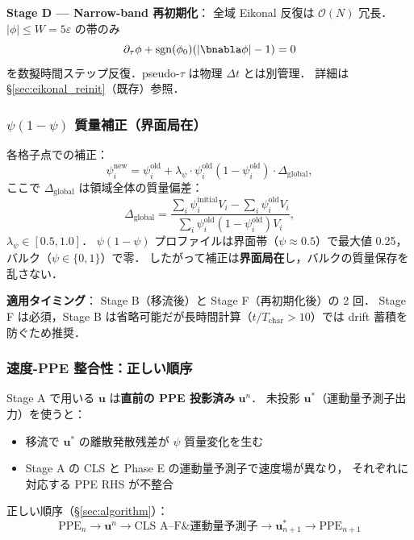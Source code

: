 \noindent\textbf{Stage D — Narrow-band 再初期化}：
全域 Eikonal 反復は $\mathcal{O}(N)$ 冗長．
$|\phi|\le W=5\varepsilon$ の帯のみ
\begin{equation*}
  \partial_\tau\phi + \mathrm{sgn}(\phi_0)(|\bnabla\phi|-1) = 0
\end{equation*}
を数擬時間ステップ反復．pseudo-$\tau$ は物理 $\Delta t$ とは別管理．
詳細は \S\ref{sec:eikonal_reinit}（既存）参照．

\subsubsection{\texorpdfstring{$\psi(1-\psi)$ 質量補正（界面局在）}{ψ(1-ψ) 質量補正（界面局在）}}
\label{sec:cls_mass_correction}

各格子点での補正：
\begin{equation}
  \psi_i^{\text{new}}
  = \psi_i^{\text{old}} + \lambda_\psi\cdot\psi_i^{\text{old}}(1-\psi_i^{\text{old}})\cdot\Delta_\text{global},
  \label{eq:cls_mass_correction}
\end{equation}
ここで $\Delta_\text{global}$ は領域全体の質量偏差：
\begin{equation*}
  \Delta_\text{global}
  = \frac{\sum_i\psi_i^{\text{initial}}V_i - \sum_i\psi_i^{\text{old}}V_i}
         {\sum_i\psi_i^{\text{old}}(1-\psi_i^{\text{old}})V_i},
\end{equation*}
$\lambda_\psi\in[0.5,1.0]$．
$\psi(1-\psi)$ プロファイルは界面帯（$\psi\approx 0.5$）で最大値 0.25，
バルク（$\psi\in\{0,1\}$）で零．
したがって補正は\textbf{界面局在}し，バルクの質量保存を乱さない．

\noindent\textbf{適用タイミング}：
Stage B（移流後）と Stage F（再初期化後）の 2 回．
Stage F は必須，Stage B は省略可能だが長時間計算（$t/T_\text{char}>10$）では
drift 蓄積を防ぐため推奨．

\subsubsection{速度-PPE 整合性：正しい順序}
\label{sec:cls_velocity_consistency}

Stage A で用いる $\mathbf{u}$ は\textbf{直前の PPE 投影済み} $\mathbf{u}^n$．
未投影 $\mathbf{u}^*$（運動量予測子出力）を使うと：
\begin{itemize}
  \item 移流で $\mathbf{u}^*$ の離散発散残差が $\psi$ 質量変化を生む
  \item Stage A の CLS と Phase E の運動量予測子で速度場が異なり，
        それぞれに対応する PPE RHS が不整合
\end{itemize}
正しい順序（\S\ref{sec:algorithm}）：
\begin{equation*}
  \text{PPE}_n\to\mathbf{u}^n\to\text{CLS A--F}\& \text{運動量予測子}\to\mathbf{u}^*_{n+1}\to\text{PPE}_{n+1}
\end{equation*}

